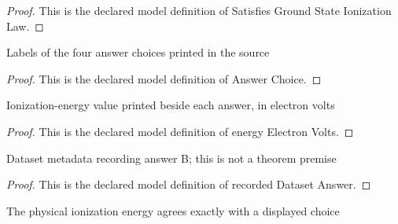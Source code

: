 \begin{proof}
  This is the declared model definition of Satisfies Ground State Ionization Law.
\end{proof}
\begin{definition}
  \label{def:physics:phyx-mini-0644:phyxminiproblems-problemphyxmini0644-answerchoice}
  Labels of the four answer choices printed in the source
\end{definition}
\begin{proof}
  This is the declared model definition of Answer Choice.
\end{proof}
\begin{definition}
  \label{def:physics:phyx-mini-0644:phyxminiproblems-problemphyxmini0644-answerchoice-energyelectronvolts}
  Ionization-energy value printed beside each answer, in electron volts
\end{definition}
\begin{proof}
  This is the declared model definition of energy Electron Volts.
\end{proof}
\begin{definition}
  \label{def:physics:phyx-mini-0644:phyxminiproblems-problemphyxmini0644-recordeddatasetanswer}
  Dataset metadata recording answer B; this is not a theorem premise
\end{definition}
\begin{proof}
  This is the declared model definition of recorded Dataset Answer.
\end{proof}
\begin{definition}
  \label{def:physics:phyx-mini-0644:phyxminiproblems-problemphyxmini0644-matchesdisplayedionizationenergy}
  The physical ionization energy agrees exactly with a displayed choice
\end{definition}
